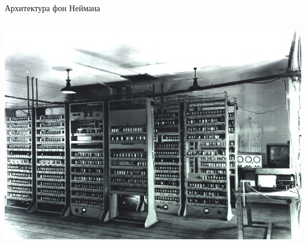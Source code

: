 \documentclass[pdf,9pt,aspectratio=169]{beamer}
\begin{document}
\begin{frame}{Архитектура фон Неймана}
\begin{columns}[c]
\begin{column}[]{0.45\textwidth}
\begin{exampleblock}
\begin{center}
          \includegraphics[height=.33\textheight]{images/EDSAC.jpg}
        \end{center}
      \end{exampleblock}
    \end{column}
  \end{columns}
\end{frame}
\end{document}
